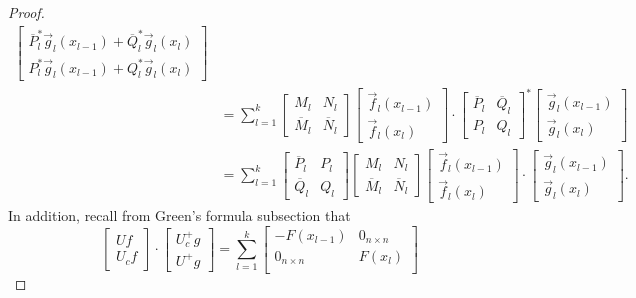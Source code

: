 \documentclass[11pt,reqno,oneside,a4paper]{article}
\theoremstyle{plain} %
\theoremstyle{definition}
\theoremstyle{remark}
\begin{document}
\begin{proof}
\begin{align*}
\begin{bmatrix}
\overline{P}^*_l \vec{g}_l(x_{l-1}) + \overline{Q}^*_l \vec{g}_l(x_l) \\
P^*_l \vec{g}_l(x_{l-1}) + Q^*_l \vec{g}_l(x_l) 
\end{bmatrix} \\
&= 
\sum^k_{l=1} 
\begin{bmatrix}
M_l & N_l  \\
\overline{M}_l & \overline{N}_l 
\end{bmatrix} 
\begin{bmatrix}
\vec{f}_l(x_{l-1}) \\
\vec{f}_l(x_l) 
\end{bmatrix}
\cdot 
\begin{bmatrix}
\overline{P}_l & \overline{Q}_l \\
P_l & Q_l 
\end{bmatrix}^*
\begin{bmatrix}
\vec{g}_l(x_{l-1}) \\
\vec{g}_l(x_l) 
\end{bmatrix}\\
&=
\sum^k_{l=1} 
\begin{bmatrix}
\overline{P}_l & P_l \\
\overline{Q}_l & Q_l 
\end{bmatrix} 
\begin{bmatrix}
M_l & N_l  \\
\overline{M}_l & \overline{N}_l 
\end{bmatrix} 
\begin{bmatrix}
\vec{f}_l(x_{l-1}) \\
\vec{f}_l(x_l) 
\end{bmatrix}
\cdot 
\begin{bmatrix}
\vec{g}_l(x_{l-1}) \\
\vec{g}_l(x_l) 
\end{bmatrix}.
\end{align*}
In addition, recall from Green's formula subsection that
\[ 
\begin{bmatrix}
Uf \\
U_c f
\end{bmatrix} \cdot 
\begin{bmatrix}
U^+_cg \\
U^+ g
\end{bmatrix} 
=
\sum^k_{l=1} 
 \begin{bmatrix}
- F(x_{l-1}) & 0_{n\times n} \\
0_{n\times n} &  F(x_{l}) \\

\end{bmatrix}\]
\end{proof}
\end{document}
